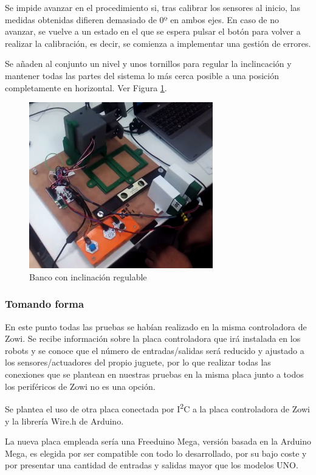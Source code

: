 Se impide avanzar en el procedimiento si, tras calibrar los sensores al inicio, las medidas obtenidas difieren demasiado de 0º en ambos ejes. En caso de no avanzar, se vuelve a un estado en el que se espera pulsar el botón para volver a realizar la calibración, es decir, se comienza a implementar una gestión de errores.

Se añaden al conjunto un nivel y unos tornillos para regular la inclincación y mantener todas las partes del sistema lo más cerca posible a una posición completamente en horizontal. Ver Figura \ref{fig:banconivel}.

\begin{figure}
\centering
\includegraphics[width=80mm]{Figures/banco_nivel}
\caption[Banco con inclinación regulable]{Banco con inclinación regulable}
\label{fig:banconivel}
\end{figure}

\subsubsection{Tomando forma}

En este punto todas las pruebas se habían realizado en la misma controladora de Zowi. Se recibe información sobre la placa controladora que irá instalada en los robots y se conoce que el número de entradas/salidas será reducido y ajustado a los sensores/actuadores del propio juguete, por lo que realizar todas las conexiones que se plantean en nuestras pruebas en la misma placa junto a todos los periféricos de Zowi no es una opción.

Se plantea el uso de otra placa conectada por I\textsuperscript{2}C a la placa controladora de Zowi y la librería Wire.h de Arduino. 

La nueva placa empleada sería una Freeduino Mega, versión basada en la Arduino Mega, es elegida por ser compatible con todo lo desarrollado, por su bajo coste y por presentar una cantidad de entradas y salidas mayor que los modelos UNO.

